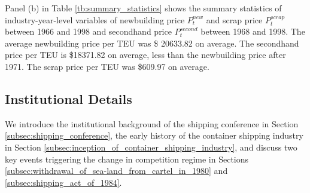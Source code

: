 \documentclass[11pt]{article}
\begin{document}
Panel (b) in Table \ref{tb:summary_statistics} shows the summary statistics of industry-year-level variables of newbuilding price $P_{t}^{new}$ and scrap price $P_{t}^{scrap}$ between 1966 and 1998 and secondhand price $P_{t}^{second}$ between 1968 and 1998. The average newbuilding price per TEU was \$ 20633.82 on average. The secondhand price per TEU is \$18371.82 on average, less than the newbuilding price after 1971. The scrap price per TEU was \$609.97 on average.

\subsection{Institutional Details}\label{subsec:institutional_details}

We introduce the institutional background of the shipping conference in Section \ref{subsec:shipping_conference}, the early history of the container shipping industry in Section \ref{subsec:inception_of_container_shipping_industry}, and discuss two key events triggering the change in competition regime in Sections \ref{subsec:withdrawal_of_sea-land_from_cartel_in_1980} and \ref{subsec:shipping_act_of_1984}.
\end{document}
